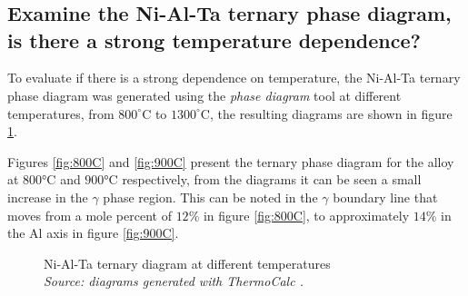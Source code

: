 \newpage
\section{}

\subsection{Examine the Ni-Al-Ta ternary phase diagram, is there a strong temperature dependence?}

To evaluate if there is a strong dependence on temperature, the Ni-Al-Ta ternary phase diagram was generated using the \textit{phase diagram} tool at different temperatures, from $800^{\circ}$C to $1300^{\circ}$C, the resulting diagrams are shown in figure \ref{fig:diagram02}.

Figures \ref{fig:800C} and \ref{fig:900C} present the ternary phase diagram for the alloy at $800$°C and $900$°C respectively, from the diagrams it can be seen a small increase in the $\gamma$ phase  region. This can be noted in the $\gamma$ boundary line that moves from a mole percent of $12\%$ in figure \ref{fig:800C}, to approximately $14\%$ in the Al axis in figure \ref{fig:900C}.

\begin{figure}[h]
  \centering
  \caption{\centering Ni-Al-Ta ternary diagram at different temperatures \\
  \textit{Source: diagrams generated with ThermoCalc \citep{thermocalc}.}}
  \label{fig:diagram02}
\end{figure}

